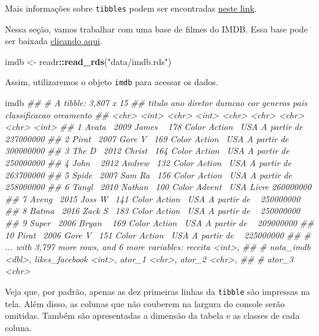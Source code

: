 \documentclass[]{book}
\newenvironment{Shaded}{\begin{snugshade}}{\end{snugshade}}
\newcommand{\CommentTok}[1]{\textcolor[rgb]{0.56,0.35,0.01}{\textit{#1}}}
\newcommand{\KeywordTok}[1]{\textcolor[rgb]{0.13,0.29,0.53}{\textbf{#1}}}
\newcommand{\NormalTok}[1]{#1}
\newcommand{\OperatorTok}[1]{\textcolor[rgb]{0.81,0.36,0.00}{\textbf{#1}}}
\newcommand{\StringTok}[1]{\textcolor[rgb]{0.31,0.60,0.02}{#1}}
\begin{document}
Mais informações sobre \texttt{tibbles} podem ser encontradas \href{http://r4ds.had.co.nz/tibbles.html}{neste link}.

Nessa seção, vamos trabalhar com uma base de filmes do IMDB. Essa base pode ser baixada \href{https://github.com/curso-r/site-v2/raw/master/content/material/importacao/data/imdb.rds}{clicando aqui}.

\begin{Shaded}
\begin{Highlighting}[]
\NormalTok{imdb <-}\StringTok{ }\NormalTok{readr}\OperatorTok{::}\KeywordTok{read_rds}\NormalTok{(}\StringTok{"data/imdb.rds"}\NormalTok{)}
\end{Highlighting}
\end{Shaded}

Assim, utilizaremos o objeto \texttt{imdb} para acessar os dados.

\begin{Shaded}
\begin{Highlighting}[]
\NormalTok{imdb}
\CommentTok{## # A tibble: 3,807 x 15}
\CommentTok{##    titulo   ano diretor duracao cor   generos pais  classificacao orcamento}
\CommentTok{##    <chr>  <int> <chr>     <int> <chr> <chr>   <chr> <chr>             <int>}
\CommentTok{##  1 Avata~  2009 James ~     178 Color Action~ USA   A partir de ~ 237000000}
\CommentTok{##  2 Pirat~  2007 Gore V~     169 Color Action~ USA   A partir de ~ 300000000}
\CommentTok{##  3 The D~  2012 Christ~     164 Color Action~ USA   A partir de ~ 250000000}
\CommentTok{##  4 John ~  2012 Andrew~     132 Color Action~ USA   A partir de ~ 263700000}
\CommentTok{##  5 Spide~  2007 Sam Ra~     156 Color Action~ USA   A partir de ~ 258000000}
\CommentTok{##  6 Tangl~  2010 Nathan~     100 Color Advent~ USA   Livre         260000000}
\CommentTok{##  7 Aveng~  2015 Joss W~     141 Color Action~ USA   A partir de ~ 250000000}
\CommentTok{##  8 Batma~  2016 Zack S~     183 Color Action~ USA   A partir de ~ 250000000}
\CommentTok{##  9 Super~  2006 Bryan ~     169 Color Action~ USA   A partir de ~ 209000000}
\CommentTok{## 10 Pirat~  2006 Gore V~     151 Color Action~ USA   A partir de ~ 225000000}
\CommentTok{## # ... with 3,797 more rows, and 6 more variables: receita <int>,}
\CommentTok{## #   nota_imdb <dbl>, likes_facebook <int>, ator_1 <chr>, ator_2 <chr>,}
\CommentTok{## #   ator_3 <chr>}
\end{Highlighting}
\end{Shaded}

Veja que, por padrão, apenas as dez primeiras linhas da \texttt{tibble} são impressas na tela. Além disso, as colunas que não couberem na largura do console serão omitidas. Também são apresentadas a dimensão da tabela e as classes de cada coluna.
\end{document}
